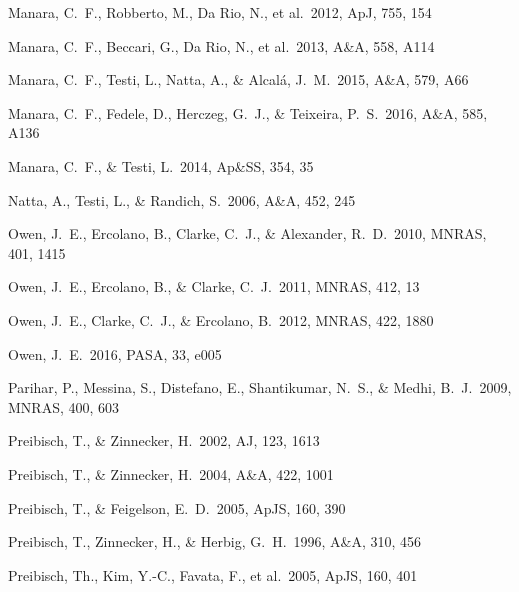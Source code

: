 \documentclass[10pt,fleqn,twoside]{article}
\newcommand*\aap{A\&A}
\newcommand*\aj{AJ}
\newcommand*\apj{ApJ}
\newcommand*\apjs{ApJS}
\newcommand*\apss{Ap\&SS}
\newcommand*\mnras{MNRAS}
\newcommand*\pasa{PASA}
\begin{document}
\begin{thebibliography}{}
 Manara, C.~F., Robberto, M., Da Rio, N., et al.\ 2012, \apj, 755, 154

 Manara, C.~F., Beccari, G., Da Rio, N., et al.\ 2013, \aap, 558, A114 

 Manara, C.~F., Testi, L., Natta, A., \& Alcal{\'a}, J.~M.\ 2015, \aap, 579, A66

 Manara, C.~F., Fedele, D., Herczeg, G.~J., \& Teixeira, P.~S.\ 2016, \aap, 585, A136 


 Manara, C.~F., \& Testi, L.\ 2014, \apss, 354, 35 

 Natta, A., Testi, L., \& Randich, S.\ 2006, \aap, 452, 245


 Owen, J.~E., Ercolano, B., Clarke, C.~J., \& Alexander, R.~D.\ 2010, \mnras, 401, 1415

 Owen, J.~E., Ercolano, B., \& Clarke, C.~J.\ 2011, \mnras, 412, 13

 Owen, J.~E., Clarke, C.~J., \& Ercolano, B.\ 2012, \mnras, 422, 1880 

 Owen, J.~E.\ 2016, \pasa, 33, e005 

 Parihar, P., Messina, S., Distefano, E., Shantikumar, N.~S., \& Medhi, B.~J.\ 2009, \mnras, 400, 603 

 Preibisch, T., \& Zinnecker, H.\ 2002, \aj, 123, 1613 

 Preibisch, T., \& Zinnecker, H.\ 2004, \aap, 422, 1001

 Preibisch, T., \& Feigelson, E.~D.\ 2005, \apjs, 160, 390

 Preibisch, T., Zinnecker, H., \& Herbig, G.~H.\ 1996, \aap, 310, 456

 Preibisch, Th., 
Kim, Y.-C., Favata, F., et al.\ 2005, \apjs, 160, 401



\end{thebibliography}
\end{document}
